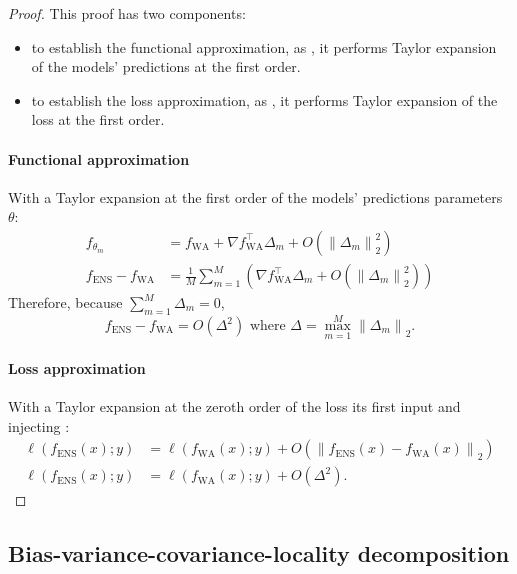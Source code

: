 \begin{proof}
This proof has two components:
\begin{itemize}
    \item to establish the functional approximation, as \cite{izmailov2018}, it performs Taylor expansion of the models' predictions at the first order.
    \item to establish the loss approximation, as \cite{Wortsman2022ModelSA}, it performs Taylor expansion of the loss at the first order.
\end{itemize}
\paragraph{Functional approximation}
With a Taylor expansion at the first order of the models' predictions \wrt parameters $\theta$:
\begin{align*}
    f_{\theta_m}&=f_{\text{WA}}+\nabla f_{\text{WA}}^\intercal \Delta_m+ O\left(\left\|\Delta_m\right\|_2^2\right)\\
    f_{\text{ENS}}-f_{\text{WA}}&=\frac{1}{M} \sum_{m=1}^{M}\left(\nabla f_{\text{WA}}^\intercal \Delta_m+O\left(\left\|\Delta_m\right\|_2^{2}\right)\right)
\end{align*}
Therefore, because $\sum_{m=1}^{M} \Delta_m=0$,
\begin{equation} \label{eq:diff_fens_fwa}
    f_{\text{ENS}}-f_{\text{WA}} = O\left(\Delta^2\right) \text{~where~}\Delta=\max_{m=1}^{M}\left\|\Delta_m\right\|_2.
\end{equation}
\paragraph{Loss approximation}
With a Taylor expansion at the zeroth order of the loss \wrt its first input and injecting :
\begin{align*}
    \ell\left(f_{\text{ENS}}(x) ; y\right)&=\ell\left(f_{\text{WA}}(x); y\right)+O\left(\left\|f_{\text{ENS}}(x)-f_{\text{WA}}(x)\right\|_2\right) \\
     \ell\left(f_{\text{ENS}}(x) ; y\right) &= \ell\left(f_{\text{WA}}(x); y\right) + O\left(\Delta^2\right).
\end{align*}
\end{proof}
\subsection{Bias-variance-covariance-locality decomposition}

